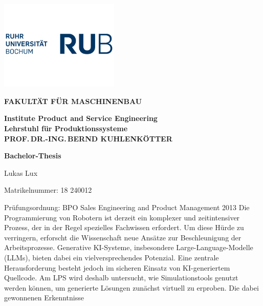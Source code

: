 \begin{titlepage}
  \rubflama %
  \thispagestyle{empty}
  \noindent
  \begin{minipage}{0.5\textwidth}%
    \includegraphics[width=56.9mm]{Figures/RUB-Logo-blau.png}
  \end{minipage}%
  \hfill%
  \begin{minipage}{0.5\textwidth}\raggedleft
    {\fontsize{9}{12}\selectfont \textcolor{rubgreen}{\bfseries FAKULTÄT FÜR
    MASCHINENBAU}}\par
    {\fontsize{8}{12}\selectfont \bfseries
      Institute Product and Service Engineering\\
      Lehrstuhl für Produktionssysteme\\
    PROF.\,DR.-ING.\,BERND KUHLENKÖTTER}%
  \end{minipage}
  \begin{center}
    {\bfseries \fontsize{16}{12}\selectfont Bachelor-Thesis}\par
    {Lukas Lux}
  \end{center}
  \fontsize{10}{12}\selectfont Matrikelnummer:  18 240012\par
  Prüfungsordnung: \quad BPO Sales Engineering and Product
  Management 2013
  \bigbreak
  \fontsize{12}{12}\selectfont{\bfseries Thema: \quad Entwicklung
    eines Frameworks zur
    simulationsbasierten Validierung
  LLM-generierten Robotercodes in Unity}
  \bigbreak
  \fontsize{10}{12}\selectfont Die Programmierung von Robotern ist derzeit ein
  komplexer und  zeitintensiver Prozess, der in der Regel spezielles Fachwissen
  erfordert. Um diese Hürde zu verringern, erforscht die Wissenschaft
  neue Ansätze zur Beschleunigung der Arbeitsprozesse. Generative
  KI-Systeme, insbesondere Large-Language-Modelle (LLMs), bieten
  dabei ein vielversprechendes Potenzial.
  Eine zentrale Herausforderung besteht jedoch im sicheren Einsatz
  von KI-generiertem Quellcode. Am LPS wird deshalb untersucht, wie
  Simulationstools genutzt werden können, um generierte Lösungen
  zunächst virtuell zu erproben. Die dabei gewonnenen Erkenntnisse

\end{titlepage}
